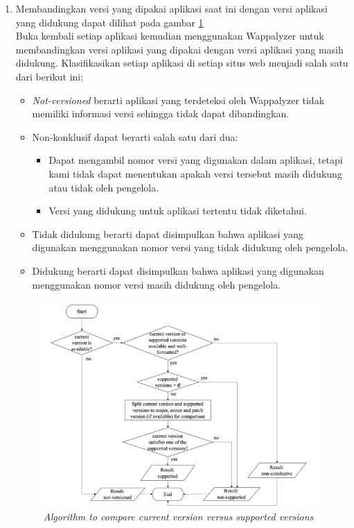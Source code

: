\begin{enumerate}
    \item Membandingkan versi yang dipakai aplikasi saat ini dengan versi aplikasi yang didukung dapat dilihat pada gambar \ref{fig:apr}\\
    Buka kembali setiap aplikasi kemudian menggunakan Wappalyzer untuk membandingkan versi aplikasi yang dipakai dengan versi aplikasi yang masih didukung. Klasifikasikan setiap aplikasi di setiap situs web menjadi salah satu dari berikut ini:
    \begin{itemize}
        \item \textit{Not-versioned} berarti aplikasi yang terdeteksi oleh Wappalyzer tidak memiliki informasi versi sehingga tidak dapat dibandingkan.
        \item Non-konklusif dapat berarti salah satu dari dua:
        \begin{itemize}
            \item Dapat mengambil nomor versi yang digunakan dalam aplikasi, tetapi kami tidak dapat menentukan apakah versi tersebut masih didukung atau tidak oleh pengelola.
            \item Versi yang didukung untuk aplikasi tertentu tidak diketahui.
        \end{itemize}
        \item Tidak didukung berarti dapat disimpulkan bahwa aplikasi yang digunakan menggunakan nomor versi yang tidak didukung oleh pengelola.
        \item Didukung berarti dapat disimpulkan bahwa aplikasi yang digunakan menggunakan nomor versi masih didukung oleh pengelola.
    \end{itemize}
    \begin{figure}[H]
	\centering  
	\includegraphics[scale=0.9]{Gambar/compare_version.PNG}  
	\caption{\textit{ Algorithm to compare current version versus supported versions}} 
	\label{fig:apr} 
\end{figure}
\end{enumerate}


